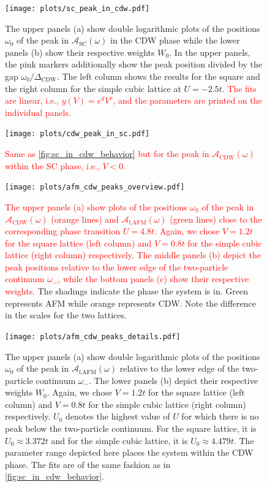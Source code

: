 \documentclass[
    reprint, 
    aps,
    preprintnumbers,
    twocolumn,
    prb,
    superscriptaddress
]{revtex4-2}
\newcommand{\spectral}[1]{\mathcal{A}_\text{#1}  (\omega)}
\newcommand{\markEdited}{red}
\begin{document}
\begin{figure}
    \centering
    \texttt{[image: plots/sc\_peak\_in\_cdw.pdf]}
    \caption{The upper panels (a) show double logarithmic plots of the positions $\omega_0$ of the peak in $\spectral{SC}$ in the CDW phase while the lower panels (b) show their respective weights $W_0$.
    In the upper panels, the pink markers additionally show the peak position divided by the gap $\omega_0 / \Delta_\text{CDW}$.
    The left column shows the results for the square and the right column for the simple cubic lattice at $U=-2.5t$.
    \textcolor{\markEdited}{The fits are linear, i.e., $y(V) = e^d V^c$, and the parameters are printed on the individual panels.}}
    \label{fig:sc_in_cdw_behavior}
\end{figure}

\begin{figure}
    \centering
    \texttt{[image: plots/cdw\_peak\_in\_sc.pdf]}
    \caption{\textcolor{\markEdited}{Same as \autoref{fig:sc_in_cdw_behavior} but for the peak in $\spectral{CDW}$ within the SC phase, i.e., $V<0$.}}
    \label{fig:cdw_in_sc_behavior}
\end{figure}

\begin{figure}
    \centering
    \texttt{[image: plots/afm\_cdw\_peaks\_overview.pdf]}
    \caption{\textcolor{\markEdited}{The upper panels (a) show plots of the positions $\omega_0$ of the peak in $\spectral{CDW}$ (orange lines) and $\spectral{l.AFM}$ (green lines) close to the corresponding phase transition $U = 4.8t$.
    Again, we chose $V=1.2t$ for the square lattice (left column) and $V=0.8t$ for the simple cubic lattice (right column) respectively.
    The middle panels (b) depict the peak positions relative to the lower edge of the two-particle continuum $\omega_-$, while the bottom panels (c) show their respective weights.}
    The shadings indicate the phase the system is in. Green represents AFM while orange represents CDW.
    Note the difference in the scales for the two lattices.}
    \label{fig:afm_cdw_peaks_overview}
\end{figure}

\begin{figure}
    \centering
    \texttt{[image: plots/afm\_cdw\_peaks\_details.pdf]}
    \caption{The upper panels (a) show double logarithmic plots of the positions $\omega_0$ of the peak in $\spectral{l.AFM}$ relative to the lower edge of the two-particle continuum $\omega_-$.
    The lower panels (b) depict their respective weights $W_0$.
    Again, we chose $V=1.2t$ for the square lattice (left column) and $V=0.8t$ for the simple cubic lattice (right column) respectively.
    $U_0$ denotes the highest value of $U$ for which there is no peak below the two-particle continuum.
    For the square lattice, it is $U_0 \approx 3.372t$ and for the simple cubic lattice, it is $U_0 \approx 4.479t$.
    The parameter range depicted here places the system within the CDW phase.
    The fits are of the same fashion as in \autoref{fig:sc_in_cdw_behavior}.}
    \label{fig:afm_cdw_peaks_details}
\end{figure}
\end{document}
